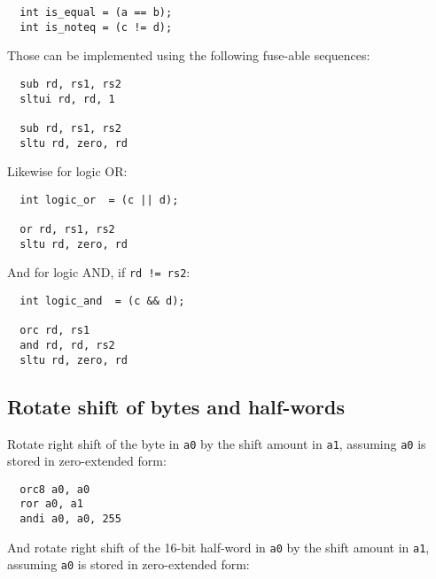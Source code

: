 \begin{minipage}{\linewidth}
\begin{verbatim}
  int is_equal = (a == b);
  int is_noteq = (c != d);
\end{verbatim}
\end{minipage}

Those can be implemented using the following fuse-able sequences:

\begin{minipage}{\linewidth}
\begin{verbatim}
  sub rd, rs1, rs2
  sltui rd, rd, 1

  sub rd, rs1, rs2
  sltu rd, zero, rd
\end{verbatim}
\end{minipage}

Likewise for logic OR:

\begin{minipage}{\linewidth}
\begin{verbatim}
  int logic_or  = (c || d);

  or rd, rs1, rs2
  sltu rd, zero, rd
\end{verbatim}
\end{minipage}

And for logic AND, if {\tt rd != rs2}:

\begin{minipage}{\linewidth}
\begin{verbatim}
  int logic_and  = (c && d);

  orc rd, rs1
  and rd, rd, rs2
  sltu rd, zero, rd
\end{verbatim}
\end{minipage}


\subsection{Rotate shift of bytes and half-words}

Rotate right shift of the byte in {\tt a0} by the shift amount in {\tt a1},
assuming {\tt a0} is stored in zero-extended form:

\begin{verbatim}
  orc8 a0, a0
  ror a0, a1
  andi a0, a0, 255
\end{verbatim}

And rotate right shift of the 16-bit half-word in {\tt a0} by the shift amount in {\tt a1},
assuming {\tt a0} is stored in zero-extended form:

